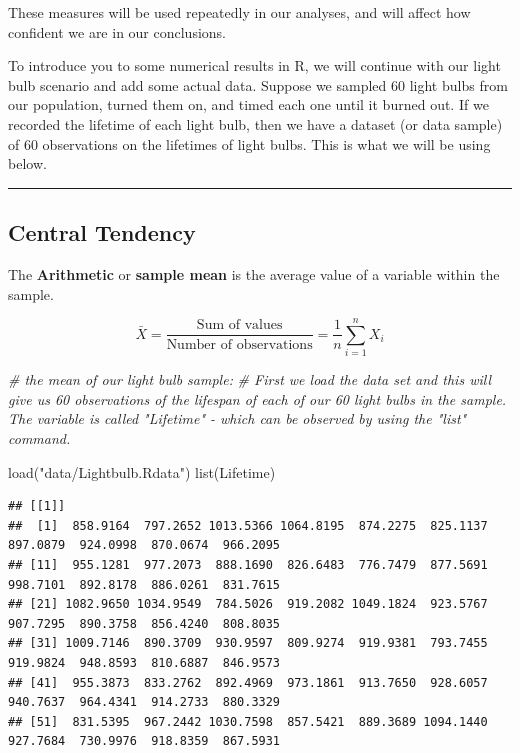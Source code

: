 \documentclass[
]{book}
\newenvironment{Shaded}{\begin{snugshade}}{\end{snugshade}}
\newcommand{\CommentTok}[1]{\textcolor[rgb]{0.56,0.35,0.01}{\textit{#1}}}
\newcommand{\FunctionTok}[1]{\textcolor[rgb]{0.00,0.00,0.00}{#1}}
\newcommand{\NormalTok}[1]{#1}
\newcommand{\StringTok}[1]{\textcolor[rgb]{0.31,0.60,0.02}{#1}}
\begin{document}
These measures will be used repeatedly in our analyses, and will affect how confident we are in our conclusions.

To introduce you to some numerical results in R, we will continue with our light bulb scenario and add some actual data. Suppose we sampled 60 light bulbs from our population, turned them on, and timed each one until it burned out. If we recorded the lifetime of each light bulb, then we have a dataset (or data sample) of 60 observations on the lifetimes of light bulbs. This is what we will be using below.

\begin{center}\rule{0.5\linewidth}{0.5pt}\end{center}

\hypertarget{central-tendency}{%
\subsection{Central Tendency}\label{central-tendency}}

The \textbf{Arithmetic} or \textbf{sample mean} is the average value of a variable within the sample.

\[\bar{X}=\frac{\text{Sum of values}}{\text{Number of observations}}=\frac{1}{n} \sum\limits_{i=1}^n X_i\]

\begin{Shaded}
\begin{Highlighting}[]
\CommentTok{\# the mean of our light bulb sample:}
\CommentTok{\# First we load the data set and this will give us 60 observations of the lifespan of each of our 60 light bulbs in the sample. The variable is called "Lifetime" {-} which can be observed by using the "list" command.}

\FunctionTok{load}\NormalTok{(}\StringTok{"data/Lightbulb.Rdata"}\NormalTok{)}
\FunctionTok{list}\NormalTok{(Lifetime)}
\end{Highlighting}
\end{Shaded}

\begin{verbatim}
## [[1]]
##  [1]  858.9164  797.2652 1013.5366 1064.8195  874.2275  825.1137  897.0879  924.0998  870.0674  966.2095
## [11]  955.1281  977.2073  888.1690  826.6483  776.7479  877.5691  998.7101  892.8178  886.0261  831.7615
## [21] 1082.9650 1034.9549  784.5026  919.2082 1049.1824  923.5767  907.7295  890.3758  856.4240  808.8035
## [31] 1009.7146  890.3709  930.9597  809.9274  919.9381  793.7455  919.9824  948.8593  810.6887  846.9573
## [41]  955.3873  833.2762  892.4969  973.1861  913.7650  928.6057  940.7637  964.4341  914.2733  880.3329
## [51]  831.5395  967.2442 1030.7598  857.5421  889.3689 1094.1440  927.7684  730.9976  918.8359  867.5931
\end{verbatim}
\end{document}
